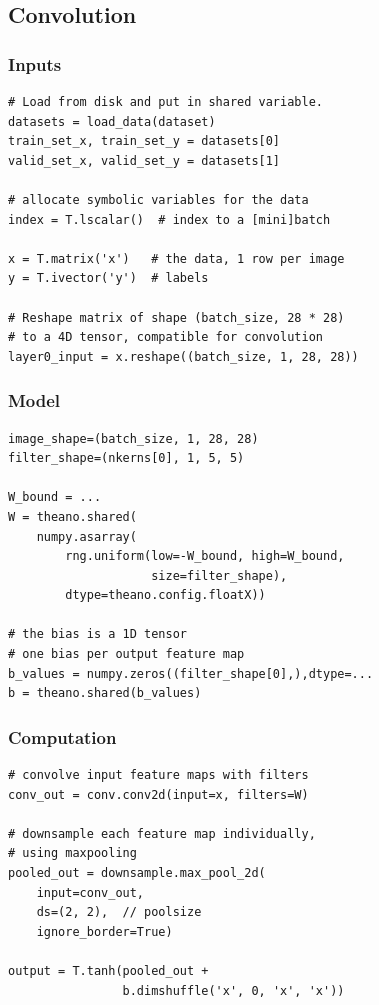 \documentclass[utf8x,xcolor=pdftex,dvipsnames,table]{beamer}
\begin{document}
\subsection{Convolution}
\begin{frame}
  \tableofcontents[currentsection]
\end{frame}
\begin{frame}[fragile]
  \frametitle{Inputs}
\begin{lstlisting}
# Load from disk and put in shared variable.
datasets = load_data(dataset)
train_set_x, train_set_y = datasets[0]
valid_set_x, valid_set_y = datasets[1]

# allocate symbolic variables for the data
index = T.lscalar()  # index to a [mini]batch

x = T.matrix('x')   # the data, 1 row per image
y = T.ivector('y')  # labels

# Reshape matrix of shape (batch_size, 28 * 28)
# to a 4D tensor, compatible for convolution
layer0_input = x.reshape((batch_size, 1, 28, 28))
\end{lstlisting}
\end{frame}


\begin{frame}[fragile]
  \frametitle{Model}
\begin{lstlisting}
image_shape=(batch_size, 1, 28, 28)
filter_shape=(nkerns[0], 1, 5, 5)

W_bound = ...
W = theano.shared(
    numpy.asarray(
        rng.uniform(low=-W_bound, high=W_bound,
                    size=filter_shape),
        dtype=theano.config.floatX))

# the bias is a 1D tensor
# one bias per output feature map
b_values = numpy.zeros((filter_shape[0],),dtype=...
b = theano.shared(b_values)
\end{lstlisting}
\end{frame}


\begin{frame}[fragile]
  \frametitle{Computation}
\begin{lstlisting}
# convolve input feature maps with filters
conv_out = conv.conv2d(input=x, filters=W)

# downsample each feature map individually,
# using maxpooling
pooled_out = downsample.max_pool_2d(
    input=conv_out,
    ds=(2, 2),  // poolsize
    ignore_border=True)

output = T.tanh(pooled_out +
                b.dimshuffle('x', 0, 'x', 'x'))
\end{lstlisting}
\end{frame}
\end{document}
